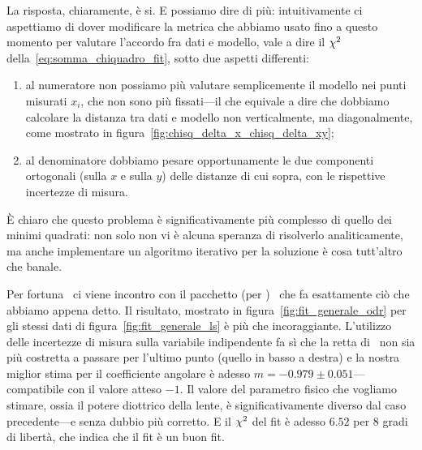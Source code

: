 La risposta, chiaramente, è si. E possiamo dire di più: intuitivamente ci
aspettiamo di dover modificare la metrica che abbiamo usato fino a questo
momento per valutare l'accordo fra dati e modello, vale a dire il $\chi^2$
della~\eqref{eq:somma_chiquadro_fit}, sotto due aspetti differenti:
\begin{enumerate}
\item al numeratore non possiamo più valutare semplicemente il modello
  nei punti misurati $x_i$, che non sono più fissati---il che equivale a dire
  che dobbiamo calcolare la distanza tra dati e modello non  verticalmente, ma
  diagonalmente, come mostrato in figura~\ref{fig:chisq_delta_x_chisq_delta_xy};
\item al denominatore dobbiamo pesare opportunamente le due componenti
  ortogonali (sulla $x$ e sulla $y$) delle distanze di cui sopra, con le
  rispettive incertezze di misura.
\end{enumerate}
\`E chiaro che questo problema è significativamente più complesso di quello
dei minimi quadrati: non solo non vi è alcuna speranza di risolverlo
analiticamente, ma anche implementare un algoritmo iterativo per la soluzione
è cosa tutt'altro che banale.


Per fortuna \scipy\ ci viene incontro con il pacchetto 
(per )~\cite{odr} che fa esattamente
ciò che abbiamo appena detto. Il risultato, mostrato in
figura~\ref{fig:fit_generale_odr} per gli stessi dati
di figura~\ref{fig:fit_generale_ls} è più che incoraggiante. L'utilizzo
delle incertezze di misura sulla variabile indipendente fa sì che la retta
di \bestfit\ non sia più costretta a passare per l'ultimo punto (quello
in basso a destra) e la nostra miglior stima per il coefficiente angolare è
adesso $m = -0.979 \pm 0.051$---compatibile con il valore atteso $-1$. Il
valore del parametro fisico che vogliamo stimare, ossia il potere diottrico
della lente, è significativamente diverso dal caso precedente---e senza
dubbio più corretto. E il $\chi^2$ del fit è adesso $6.52$ per $8$ gradi di
libertà, che indica che il fit è un buon fit.

